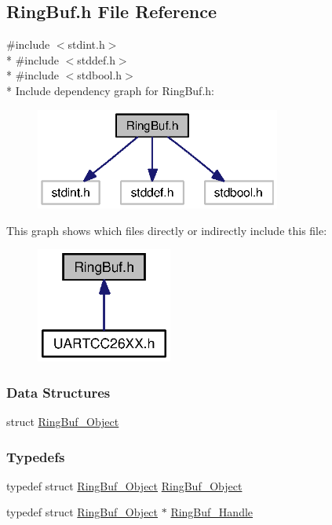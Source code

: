 \subsection{Ring\+Buf.\+h File Reference}
\label{_ring_buf_8h}
{\ttfamily \#include $<$stdint.\+h$>$}\\*
{\ttfamily \#include $<$stddef.\+h$>$}\\*
{\ttfamily \#include $<$stdbool.\+h$>$}\\*
Include dependency graph for Ring\+Buf.\+h\+:
\nopagebreak
\begin{figure}[H]
\begin{center}
\leavevmode
\includegraphics[width=229pt]{_ring_buf_8h__incl}
\end{center}
\end{figure}
This graph shows which files directly or indirectly include this file\+:
\nopagebreak
\begin{figure}[H]
\begin{center}
\leavevmode
\includegraphics[width=127pt]{_ring_buf_8h__dep__incl}
\end{center}
\end{figure}
\subsubsection*{Data Structures}
\begin{DoxyCompactItemize}
\item 
struct \hyperlink{struct_ring_buf___object}{Ring\+Buf\+\_\+\+Object}
\end{DoxyCompactItemize}
\subsubsection*{Typedefs}
\begin{DoxyCompactItemize}
\item 
typedef struct \hyperlink{struct_ring_buf___object}{Ring\+Buf\+\_\+\+Object} \hyperlink{_ring_buf_8h_af6920ef38868fbc57971fdbbab477d0d}{Ring\+Buf\+\_\+\+Object}
\item 
typedef struct \hyperlink{struct_ring_buf___object}{Ring\+Buf\+\_\+\+Object} $\ast$ \hyperlink{_ring_buf_8h_ade97ef8496bcec2a38a8695128458883}{Ring\+Buf\+\_\+\+Handle}
\end{DoxyCompactItemize}
